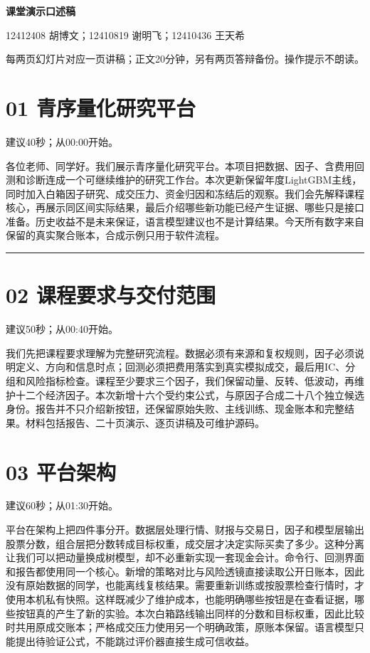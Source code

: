 \documentclass[UTF8,a4paper,12pt]{ctexart}
\begin{document}
{\Large\bfseries\color{ink}课堂演示口述稿}\par

12412408 胡博文；12410819 谢明飞；12410436 王天希

每两页幻灯片对应一页讲稿；正文20分钟，另有两页答辩备份。操作提示不朗读。

\section*{\color{ink}01  青序量化研究平台}

{\small\color{accent}建议40秒；从00:00开始。}\par

各位老师、同学好。我们展示青序量化研究平台。本项目把数据、因子、含费用回测和诊断连成一个可继续维护的研究工作台。本次更新保留年度LightGBM主线，同时加入白箱因子研究、成交压力、资金归因和冻结后的观察。我们会先解释课程核心，再展示同区间实际结果，最后介绍哪些新功能已经产生证据、哪些只是接口准备。历史收益不是未来保证，语言模型建议也不是计算结果。今天所有数字来自保留的真实聚合账本，合成示例只用于软件流程。


\vspace{4mm}\noindent\textcolor{accent!40}{\rule{\textwidth}{0.4pt}}\par

\section*{\color{ink}02  课程要求与交付范围}

{\small\color{accent}建议50秒；从00:40开始。}\par

我们先把课程要求理解为完整研究流程。数据必须有来源和复权规则，因子必须说明定义、方向和信息时点；回测必须把费用落实到真实模拟成交，最后用IC、分组和风险指标检查。课程至少要求三个因子，我们保留动量、反转、低波动，再维护十二个经济因子。本次新增十六个受约束公式，与原因子合成二十八个独立候选身份。报告并不只介绍新按钮，还保留原始失败、主线训练、现金账本和完整结果。材料包括报告、二十页演示、逐页讲稿及可维护源码。


\newpage

\section*{\color{ink}03  平台架构}

{\small\color{accent}建议60秒；从01:30开始。}\par

平台在架构上把四件事分开。数据层处理行情、财报与交易日，因子和模型层输出股票分数，组合层把分数转成目标权重，成交层才决定实际买卖了多少。这种分离让我们可以把动量换成树模型，却不必重新实现一套现金会计。命令行、回测界面和报告都使用同一个核心。新增的策略对比与风险透镜直接读取公开日账本，因此没有原始数据的同学，也能离线复核结果。需要重新训练或按股票检查行情时，才使用本机私有快照。这样既减少了维护成本，也能明确哪些按钮是在查看证据，哪些按钮真的产生了新的实验。本次白箱路线输出同样的分数和目标权重，因此比较时共用原成交账本；严格成交压力使用另一个明确政策，原账本保留。语言模型只能提出待验证公式，不能跳过评价器直接生成可信收益。
\end{document}

